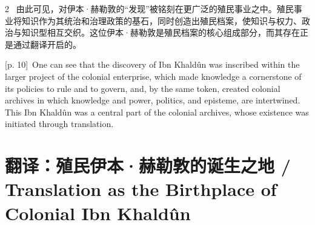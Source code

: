 \documentclass[10pt,a4paper]{article}
\begin{document}
\begin{paracol}{2}
\switchcolumn*
{\scriptsize\color{gray} [p. 10]}\ 由此可见，对伊本·赫勒敦的“发现”被铭刻在更广泛的殖民事业之中。殖民事业将知识作为其统治和治理政策的基石，同时创造出殖民档案，使知识与权力、政治与知识型相互交织。这位伊本·赫勒敦是殖民档案的核心组成部分，而其存在正是通过翻译开启的。\par
\switchcolumn
{\scriptsize\color{gray} [p. 10]}\ One can see that the discovery of Ibn Khaldûn was inscribed within the larger project of the colonial enterprise, which made knowledge a cornerstone of its policies to rule and to govern, and, by the same token, created colonial archives in which knowledge and power, politics, and episteme, are intertwined. This Ibn Khaldûn was a central part of the colonial archives, whose existence was initiated through translation.\par
\switchcolumn*
\end{paracol}
\section*{翻译：殖民伊本·赫勒敦的诞生之地 / Translation as the Birthplace of Colonial Ibn Khaldûn}
\end{document}
